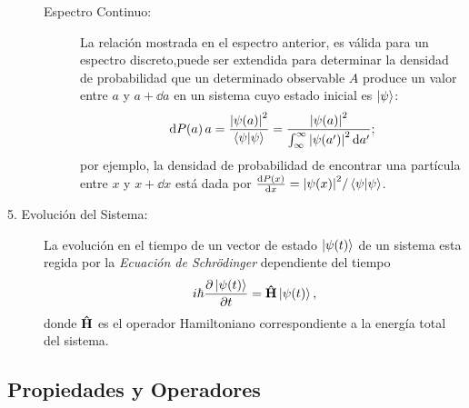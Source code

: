 \begin{description}
\begin{description}
            \item[Espectro Continuo: ] La relación mostrada en el espectro anterior, es válida para un espectro discreto,puede ser extendida para determinar la densidad de probabilidad que un determinado observable $A$ produce un valor entre $a$ y $a + \dd{a}$ en un sistema cuyo estado inicial es $\ket{\psi}$:
                $$ \dd{P(a)}{a} = \frac{\abs{\psi(a)}^2}{\braket{\psi}} = \frac{\abs{\psi (a)}^2}{\int _{\infty} ^\infty \abs{\psi(a')}^2 \dd{a'}}; $$
            por ejemplo, la densidad de probabilidad de encontrar una partícula entre $x$ y $x + \dd{x}$ está dada por $\dv{P(x)}{x} = \abs{\psi (x)}^2/\braket{\psi}$.
        \end{description}
    \item[5. Evolución del Sistema: ]  La evolución en el tiempo de un vector de estado $\ket{\psi (t)}$ de un sistema esta regida por la \textit{Ecuación de Schrödinger} dependiente del tiempo
        $$ i\hbar \pdv{\ket{\psi (t)}}{t} = \vu{H} \ket{\psi (t)} , $$
    donde $\vu{H}$ es el operador Hamiltoniano correspondiente a la energía total del sistema.
\end{description}


\subsection{Propiedades y Operadores}

